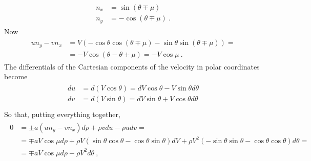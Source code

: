 \documentclass[letterpaper,10pt,english]{jupyterBook}
\begin{document}
\sphinxAtStartPar
{} 
\begin{equation*}
\begin{split}\begin{aligned}
  n_x & = \sin ( \theta \mp \mu ) \\
  n_y & = - \cos ( \theta \mp  \mu ) \ .
\end{aligned}\end{split}
\end{equation*}
\sphinxAtStartPar
Now
\begin{equation*}
\begin{split}\begin{aligned}
  u n_y - v n_x
  & = V \left( - \cos \theta \cos ( \theta \mp \mu ) - \sin \theta \sin ( \theta \mp \mu ) \right) = \\
  & = - V \cos ( \theta - \theta \pm \mu ) = - V \cos \mu \ .
\end{aligned}\end{split}
\end{equation*}
\sphinxAtStartPar
The differentials of the Cartesian components of the velocity in polar coordinates become
\begin{equation*}
\begin{split}\begin{aligned}
  d u 
  & = d ( V \cos \theta ) = dV \cos \theta - V \sin \theta d \theta \\
  d v 
  & = d ( V \sin \theta ) = dV \sin \theta + V \cos \theta d \theta \\
\end{aligned}\end{split}
\end{equation*}
\sphinxAtStartPar
So that, putting everything together,
\begin{equation*}
\begin{split}\begin{aligned}
  0
  & = \pm a ( u n_y - v n_x ) d \rho + \rho v d u - \rho u d v = \\
  & = \mp a V \cos \mu d \rho + \rho V \left( \sin \theta \cos \theta - \cos \theta \sin \theta \right) d V + \rho V^2 \left( - \sin \theta \sin \theta - \cos \theta \cos \theta  \right) d \theta = \\
  & = \mp a V \cos \mu d \rho - \rho V^2 d \theta \ ,
\end{aligned}\end{split}
\end{equation*}
\end{document}
